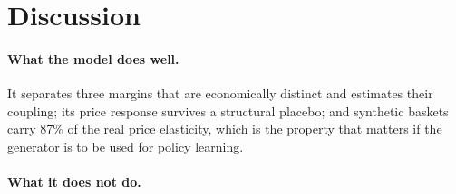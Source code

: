 \documentclass[11pt]{article}
\begin{document}
\section{Discussion}
\label{sec:disc}

\paragraph{What the model does well.} It separates three margins that are economically
distinct and estimates their coupling; its price response survives a structural placebo;
and synthetic baskets carry 87\% of the real price elasticity, which is the
property that matters if the generator is to be used for policy learning.

\paragraph{What it does not do.}
\end{document}
